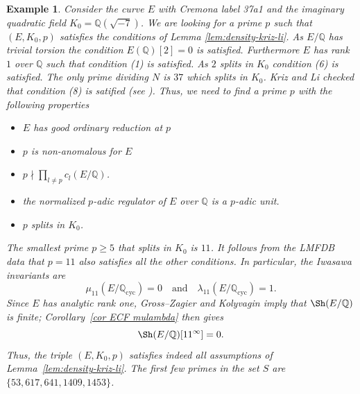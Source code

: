 \documentclass[12pt]{amsart}
\newtheorem{example}[theorem]{Example}
\newcommand{\Q}{\mathbb{Q}}
\newcommand{\op}[1]{\operatorname{#1}}
\numberwithin{equation}{section}
\begin{document}
\begin{example}\label{important example}
Consider the curve $E$ with Cremona label 37a1 and the imaginary quadratic field $K_0=\Q(\sqrt{-7})$. We are looking for a prime $p$ such that $(E,K_0,p)$ satisfies the conditions of Lemma \ref{lem:density-kriz-li}. As $E/\Q$ has trivial torsion the condition $E(\Q)[2]=0$ is satisfied. Furthermore $E$ has rank $1$ over $\Q$ such that condition (1) is satisfied. As $2$ splits in $K_0$ condition (6) is satisfied. The only prime dividing $N$ is $37$ which splits in $K_0$. Kriz and Li checked that condition (8) is satified (see \cite[Example 6.1]{kriz-li}). Thus, we need to find a prime $p$ with the following properties
\begin{itemize}
    \item $E$ has good ordinary reduction at $p$
    \item $p$ is non-anomalous for $E$
    \item $p\nmid \prod_{l\neq p}c_l(E/\Q)$.
    \item the normalized $p$-adic regulator of $E$ over $\Q$ is a $p$-adic unit.
    \item $p$ splits in $K_0$.
\end{itemize}

The smallest prime $p\ge 5$ that splits in $K_0$ is $11$. It follows from the LMFDB data that $p=11$ also satisfies all the other conditions. In particular, the Iwasawa invariants are
\[
    \mu_{11}(E/\Q_{\op{cyc}})=0
    \quad\text{and}\quad
    \lambda_{11}(E/\Q_{\op{cyc}})=1.
\]
Since $E$ has analytic rank one, Gross--Zagier and Kolyvagin imply that $\Sh(E/\Q)$ is finite; Corollary~\ref{cor ECF mulambda} then gives
\[
    \Sh(E/\Q)[11^\infty]=0.
\]
Thus, the triple $(E,K_0,p)$ satisfies indeed all assumptions of Lemma~\ref{lem:density-kriz-li}. The first few primes in the set $S$ are $\{53,617,641,1409,1453\}$.


\end{example}
\end{document}

